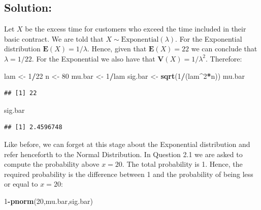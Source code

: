 \documentclass[]{krantz}
\makeatletter
\newenvironment{Shaded}{\begin{snugshade}}{\end{snugshade}}
\newcommand{\DecValTok}[1]{\textcolor[rgb]{0.00,0.00,0.81}{#1}}
\newcommand{\KeywordTok}[1]{\textcolor[rgb]{0.13,0.29,0.53}{\textbf{#1}}}
\newcommand{\NormalTok}[1]{#1}
\newcommand{\OperatorTok}[1]{\textcolor[rgb]{0.81,0.36,0.00}{\textbf{#1}}}
\newcommand{\StringTok}[1]{\textcolor[rgb]{0.31,0.60,0.02}{#1}}
\newcommand{\Expec}{\mathbf{E}}
\newcommand{\Var}{\mathbf{V}}
\newenvironment{kframe}{%
\medskip{}
\setlength{\fboxsep}{.8em}
 \def\at@end@of@kframe{}%
 \ifinner\ifhmode%
  \def\at@end@of@kframe{\end{minipage}}%
  \begin{minipage}{\columnwidth}%
 \fi\fi%
 \def\FrameCommand##1{\hskip\@totalleftmargin \hskip-\fboxsep
 \colorbox{shadecolor}{##1}\hskip-\fboxsep
     \hskip-\linewidth \hskip-\@totalleftmargin \hskip\columnwidth}%
 \MakeFramed {\advance\hsize-\width
   \@totalleftmargin\z@ \linewidth\hsize
   \@setminipage}}%
 {\par\unskip\endMakeFramed%
 \at@end@of@kframe}
\renewenvironment{Shaded}{\begin{kframe}}{\end{kframe}}
\theoremstyle{definition}
\theoremstyle{definition}
\theoremstyle{definition}
\theoremstyle{remark}
\makeatother
\begin{document}
\hypertarget{solution-2}{%
\subsection*{Solution:}\label{solution-2}}


Let \(X\) be the excess time for customers who exceed the time included in
their basic contract. We are told that
\(X \sim \mathrm{Exponential}(\lambda)\). For the Exponential distribution
\(\Expec(X) = 1/\lambda\). Hence, given that \(\Expec(X) = 22\) we can
conclude that \(\lambda = 1/22\). For the Exponential we also have that
\(\Var(X) = 1/\lambda^2\). Therefore:

\begin{Shaded}
\begin{Highlighting}[]
\NormalTok{lam <-}\StringTok{ }\DecValTok{1}\OperatorTok{/}\DecValTok{22}
\NormalTok{n <-}\StringTok{ }\DecValTok{80}
\NormalTok{mu.bar <-}\StringTok{ }\DecValTok{1}\OperatorTok{/}\NormalTok{lam}
\NormalTok{sig.bar <-}\StringTok{ }\KeywordTok{sqrt}\NormalTok{(}\DecValTok{1}\OperatorTok{/}\NormalTok{(lam}\OperatorTok{^}\DecValTok{2}\OperatorTok{*}\NormalTok{n))}
\NormalTok{mu.bar}
\end{Highlighting}
\end{Shaded}

\begin{verbatim}
## [1] 22
\end{verbatim}

\begin{Shaded}
\begin{Highlighting}[]
\NormalTok{sig.bar}
\end{Highlighting}
\end{Shaded}

\begin{verbatim}
## [1] 2.4596748
\end{verbatim}

Like before, we can forget at this stage about the Exponential
distribution and refer henceforth to the Normal Distribution. In
Question 2.1 we are asked to compute the probability above \(x=20\). The
total probability is 1. Hence, the required probability is the
difference between 1 and the probability of being less or equal to
\(x=20\):

\begin{Shaded}
\begin{Highlighting}[]
\DecValTok{1}\OperatorTok{-}\KeywordTok{pnorm}\NormalTok{(}\DecValTok{20}\NormalTok{,mu.bar,sig.bar)}
\end{Highlighting}
\end{Shaded}
\end{document}
